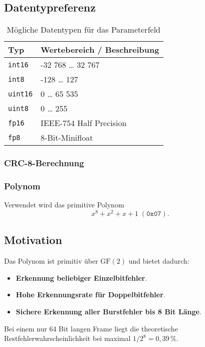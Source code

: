 \documentclass[main.tex]{subfiles} %
\begin{document}
\subsection*{Datentypreferenz}
\begin{table}[h!]
  \centering
  \begin{tabular}{l l}
    \toprule
    \textbf{Typ}    & \textbf{Wertebereich / Beschreibung} \\
    \midrule
    \texttt{int16}  & -32 768 … 32 767                     \\
    \texttt{int8}   & -128 … 127                           \\
    \texttt{uint16} & 0 … 65 535                           \\
    \texttt{uint8}  & 0 … 255                              \\
    \texttt{fp16}   & IEEE-754 Half Precision              \\
    \texttt{fp8}    & 8-Bit-Minifloat                      \\
    \bottomrule
  \end{tabular}
  \caption{Mögliche Datentypen für das Parameterfeld}
  \label{tab:types}
\end{table}

\newpage
\subsubsection*{CRC-8-Berechnung}

\subsubsection*{Polynom}
Verwendet wird das primitive Polynom
\[
  x^{8} + x^{2} + x + 1 \;(\texttt{0x07}).
\]

\subsection*{Motivation}
Das Polynom ist primitiv über \(\mathrm{GF}(2)\) und bietet dadurch:
\begin{itemize}
  \item \textbf{Erkennung beliebiger Einzelbitfehler}.
  \item \textbf{Hohe Erkennungsrate für Doppelbitfehler}.
  \item \textbf{Sichere Erkennung aller Burstfehler bis 8 Bit Länge}.
\end{itemize}
Bei einem nur 64 Bit langen Frame liegt die theoretische
Restfehlerwahrscheinlichkeit bei maximal \(1/2^{8}=0{,}39\,\%\).
\end{document}
